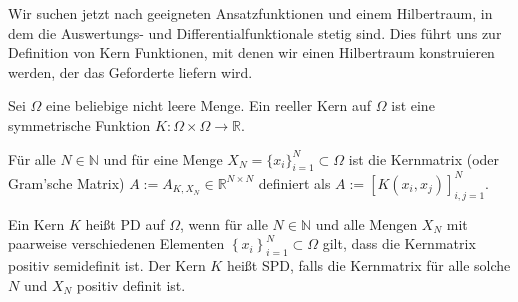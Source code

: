 Wir suchen jetzt nach geeigneten Ansatzfunktionen und einem Hilbertraum, in dem die Auswertungs- und Differentialfunktionale stetig sind. Dies führt uns zur Definition von Kern Funktionen, mit denen wir einen Hilbertraum konstruieren werden, der das Geforderte liefern wird.

\begin{definition}
\label{Kern}
Sei $\Omega$ eine beliebige nicht leere Menge. Ein reeller Kern auf $\Omega$ ist eine symmetrische Funktion $K: \Omega \times \Omega \rightarrow \mathbb{R}$.

Für alle $N \in \mathbb{N}$ und für eine Menge $X_N = \{x_i\}_{i=1}^N \subset \Omega$ ist die Kernmatrix (oder Gram'sche Matrix) $A:= A_{K,X_N} \in \mathbb{R}^{N \times N}$  definiert als $A:=[K(x_i, x_j)]_{i,j=1}^N$.

Ein Kern $K$ heißt \ac{PD} auf $\Omega$, wenn für alle $N \in \mathbb{N}$ und alle Mengen $X_N$ mit paarweise verschiedenen Elementen $\left\{x_i\right\}_{i=1}^N \subset \Omega$ gilt, dass die Kernmatrix positiv semidefinit ist. Der Kern $K$ heißt \ac{SPD}, falls die Kernmatrix für alle solche $N$ und $X_N$ positiv definit ist.
\end{definition}

